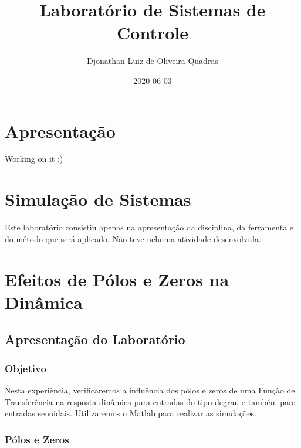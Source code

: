 \documentclass[
]{book}
\title{Laboratório de Sistemas de Controle}
\author{Djonathan Luiz de Oliveira Quadras}
\date{2020-06-03}
\begin{document}
\maketitle

{
\setcounter{tocdepth}{1}
\tableofcontents
}
\hypertarget{apresentauxe7uxe3o}{%
\chapter*{Apresentação}\label{apresentauxe7uxe3o}}

Working on it :)

\hypertarget{simulauxe7uxe3o-de-sistemas}{%
\chapter{Simulação de Sistemas}\label{simulauxe7uxe3o-de-sistemas}}

Este laboratório consistiu apenas na apresentação da disciplina, da ferramenta e do método que será aplicado. Não teve nehuma atividade desenvolvida.

\hypertarget{efeitos-de-puxf3los-e-zeros-na-dinuxe2mica}{%
\chapter{Efeitos de Pólos e Zeros na Dinâmica}\label{efeitos-de-puxf3los-e-zeros-na-dinuxe2mica}}

\hypertarget{apresentauxe7uxe3o-do-laboratuxf3rio}{%
\section{Apresentação do Laboratório}\label{apresentauxe7uxe3o-do-laboratuxf3rio}}

\hypertarget{objetivo}{%
\subsection{Objetivo}\label{objetivo}}

Nesta experiência, verificaremos a influência dos pólos e zeros de uma Função de Transferência na resposta dinâmica para entradas do tipo degrau e também para entradas senoidais. Utilizaremos o Matlab para realizar as
simulações.

\hypertarget{puxf3los-e-zeros}{%
\subsection{Pólos e Zeros}\label{puxf3los-e-zeros}}
\end{document}
